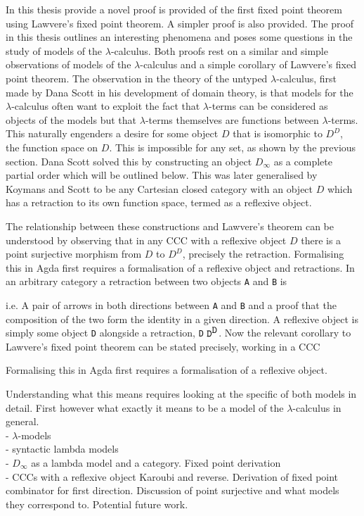 In this thesis provide a novel proof is provided of the first fixed point
theorem using Lawvere's fixed point theorem. A simpler proof is also provided.
The proof in this thesis outlines an interesting phenomena and poses some
questions in the study of models of the $\lambda$-calculus. Both proofs rest on
a similar and simple observations of models of the $\lambda$-calculus and a
simple corollary of Lawvere's fixed point theorem. The observation in the
theory of the untyped $\lambda$-calculus, first made by Dana Scott in his
development of domain theory, is that models for the $\lambda$-calculus often
want to exploit the fact that $\lambda$-terms can be considered as objects of
the models but that $\lambda$-terms themselves are functions between
$\lambda$-terms. This naturally engenders a desire for some object $D$ that is
isomorphic to $D^D$, the function space on $D$. This is impossible for any set,
as shown by the previous section. Dana Scott solved this by constructing an
object $D_{\infty}$ as a complete partial order which will be outlined below.
This was later generalised by Koymans and Scott to be any Cartesian closed
category with an object $D$ which has a retraction to its own function space,
termed as a reflexive object.

The relationship between these constructions and Lawvere's theorem can be
understood by observing that in any CCC with a reflexive object $D$ there is a
point surjective morphism from $D$ to $D^D$, precisely the retraction.
Formalising this in Agda first requires a formalisation of a reflexive object
and retractions. In an arbitrary category a retraction between two objects
\verb|A| and \verb|B| is


i.e. A pair of arrows in both directions between \verb|A| and \verb|B| and a
proof that the composition of the two form the identity in a given direction.
A reflexive object is simply some object \verb|D| alongside a retraction,
 \verb|D| $\verb|D|^{\verb|D|}$. Now the relevant
corollary to Lawvere's fixed point theorem can be stated precisely, working in a
CCC


Formalising this in Agda first requires a formalisation of a reflexive object.

Understanding what this means requires looking at the specific of both models in
detail. First however what exactly it means to be a model of the
$\lambda$-calculus in general.
\\
- $\lambda$-models \\
- syntactic lambda models \\
- $D_{\infty}$ as a lambda model and a category. Fixed point derivation \\
- CCCs with a reflexive object Karoubi and reverse. Derivation of fixed point
combinator for first direction. Discussion of point surjective and what models
they correspond to. Potential future work.
